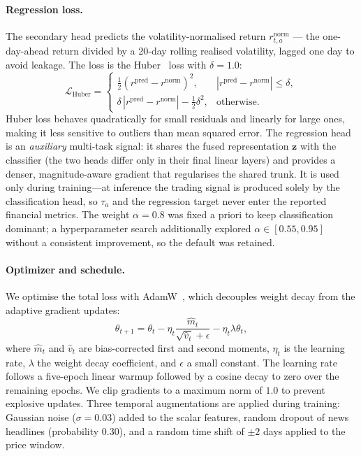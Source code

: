 \documentclass[runningheads]{llncs}
\begin{document}
\paragraph{Regression loss.}
The secondary head predicts the volatility-normalised return
$r^{\text{norm}}_{t,a}$ --- the one-day-ahead return divided by a
20-day rolling realised volatility, lagged one day to avoid leakage. The loss
is the Huber~\cite{huber1964} loss with $\delta = 1.0$:
\begin{equation}
\mathcal{L}_{\text{Huber}} =
\begin{cases}
\frac{1}{2} (r^{\text{pred}} - r^{\text{norm}})^2,
& |r^{\text{pred}} - r^{\text{norm}}| \leq \delta,\\[4pt]
\delta \, |r^{\text{pred}} - r^{\text{norm}}| - \frac{1}{2}\delta^2,
& \text{otherwise}.
\end{cases}
\end{equation}
Huber loss behaves quadratically for small residuals and linearly for large
ones, making it less sensitive to outliers than mean squared error. The
regression head is an \emph{auxiliary} multi-task signal: it shares the fused
representation $\mathbf{z}$ with the classifier (the two heads differ only in
their final linear layers) and provides a denser, magnitude-aware gradient that
regularises the shared trunk. It is used only during training---at inference the
trading signal is produced solely by the classification head, so $\tau_a$ and
the regression target never enter the reported financial metrics. The weight
$\alpha = 0.8$ was fixed a priori to keep classification dominant; a
hyperparameter search additionally explored $\alpha \in [0.55, 0.95]$ without a
consistent improvement, so the default was retained.

\paragraph{Optimizer and schedule.}
We optimise the total loss with AdamW~\cite{loshchilov2019}, which decouples
weight decay from the adaptive gradient updates:
\begin{equation}
\theta_{t+1} = \theta_t - \eta_t \frac{\hat{m}_t}{\sqrt{\hat{v}_t} + \epsilon}
- \eta_t \lambda \theta_t,
\end{equation}
where $\hat{m}_t$ and $\hat{v}_t$ are bias-corrected first and second moments,
$\eta_t$ is the learning rate, $\lambda$ the weight decay coefficient, and
$\epsilon$ a small constant. The learning rate follows a five-epoch linear
warmup followed by a cosine decay to zero over the remaining epochs. We clip
gradients to a maximum norm of $1.0$ to prevent explosive updates. Three
temporal augmentations are applied during training: Gaussian noise ($\sigma =
0.03$) added to the scalar features, random dropout of news headlines
(probability $0.30$), and a random time shift of $\pm 2$ days applied to the
price window.
\end{document}
